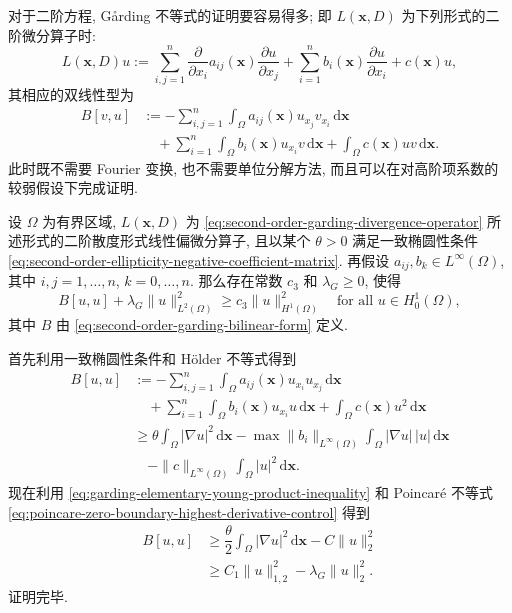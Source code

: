 对于二阶方程, Gårding 不等式的证明要容易得多; 即 $L(\bm{x},D)$ 为下列形式的二阶微分算子时:
\begin{equation}\label{eq:second-order-garding-divergence-operator}
L(\bm{x},D)u:=\sum_{i,j=1}^n\frac{\partial}{\partial x_i}a_{ij}(\bm{x})\frac{\partial u}{\partial x_j}+\sum_{i=1}^nb_i(\bm{x})\frac{\partial u}{\partial x_i}+c(\bm{x})u,
\end{equation}
其相应的双线性型为
\begin{equation}\label{eq:second-order-garding-bilinear-form}
\begin{aligned}
B[v,u]&:=-\sum_{i,j=1}^n\int_\Omega a_{ij}(\bm{x})u_{x_j}v_{x_i}\,\mathrm{d}\bm{x}\\
&\quad+\sum_{i=1}^n\int_\Omega b_i(\bm{x})u_{x_i}v\,\mathrm{d}\bm{x}+\int_\Omega c(\bm{x})uv\,\mathrm{d}\bm{x}.
\end{aligned}
\end{equation}
此时既不需要 Fourier 变换, 也不需要单位分解方法, 而且可以在对高阶项系数的较弱假设下完成证明.

\begin{Theorem}
\label{thm:second-order-garding-inequality}
设 $\Omega$ 为有界区域, $L(\bm{x},D)$ 为 \eqref{eq:second-order-garding-divergence-operator} 所述形式的二阶散度形式线性偏微分算子, 且以某个 $\theta>0$ 满足一致椭圆性条件 \eqref{eq:second-order-ellipticity-negative-coefficient-matrix}. 再假设 $a_{ij},b_k\in L^\infty(\Omega)$, 其中 $i,j=1,\ldots,n$, $k=0,\ldots,n$. 那么存在常数 $c_3$ 和 $\lambda_G\geq0$, 使得
\begin{equation}\label{eq:second-order-garding-energy-inequality}
B[u,u]+\lambda_G\|u\|_{L^2(\Omega)}^2\geq c_3\|u\|_{H^1(\Omega)}^2\quad\text{for all }u\in H_0^1(\Omega),
\end{equation}
其中 $B$ 由 \eqref{eq:second-order-garding-bilinear-form} 定义.
\end{Theorem}

\begin{Proof}
首先利用一致椭圆性条件和 Hölder 不等式得到\[\begin{aligned}
B[u,u]&:=-\sum_{i,j=1}^n\int_\Omega a_{ij}(\bm{x})u_{x_i}u_{x_j}\,\mathrm{d}\bm{x}\\
&\quad+\sum_{i=1}^n\int_\Omega b_i(\bm{x})u_{x_i}u\,\mathrm{d}\bm{x}+\int_\Omega c(\bm{x})u^2\,\mathrm{d}\bm{x}\\
&\geq\theta\int_\Omega|\nabla u|^2\,\mathrm{d}\bm{x}-\max\|b_i\|_{L^\infty(\Omega)}\int_\Omega|\nabla u|\,|u|\,\mathrm{d}\bm{x}\\
&\quad-\|c\|_{L^\infty(\Omega)}\int_\Omega|u|^2\,\mathrm{d}\bm{x}.
\end{aligned}\]现在利用 \eqref{eq:garding-elementary-young-product-inequality} 和 Poincaré 不等式 \eqref{eq:poincare-zero-boundary-highest-derivative-control} 得到\[\begin{aligned}
B[u,u]&\geq\dfrac{\theta}{2}\int_\Omega|\nabla u|^2\,\mathrm{d}\bm{x}-C\|u\|_2^2\\
&\geq C_1\|u\|_{1,2}^2-\lambda_G\|u\|_2^2.
\end{aligned}\]证明完毕.
\end{Proof}
